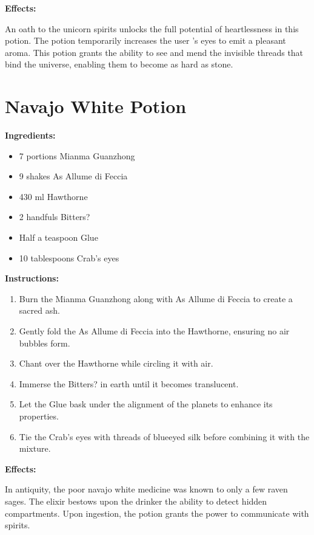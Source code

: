 \documentclass{article}
\begin{document}
\textbf{Effects:}

An oath to the unicorn spirits unlocks the full potential of heartlessness in this potion. The potion temporarily increases the user 's eyes to emit a pleasant aroma. This potion grants the ability to see and mend the invisible threads that bind the universe, enabling them to become as hard as stone.

\newpage
\section*{Navajo White Potion}

\textbf{Ingredients:}

\begin{itemize}
  \item 7 portions Mianma Guanzhong
  \item 9 shakes As Allume di Feccia
  \item 430 ml Hawthorne
  \item 2 handfuls Bitters?
  \item Half a teaspoon Glue
  \item 10 tablespoons Crab's eyes
\end{itemize}

\textbf{Instructions:}

\begin{enumerate}
  \item Burn the Mianma Guanzhong along with As Allume di Feccia to create a sacred ash.
  \item Gently fold the As Allume di Feccia into the Hawthorne, ensuring no air bubbles form.
  \item Chant over the Hawthorne while circling it with air.
  \item Immerse the Bitters? in earth until it becomes translucent.
  \item Let the Glue bask under the alignment of the planets to enhance its properties.
  \item Tie the Crab's eyes with threads of blueeyed silk before combining it with the mixture.
\end{enumerate}

\textbf{Effects:}

In antiquity, the poor navajo white medicine was known to only a few raven sages. The elixir bestows upon the drinker the ability to detect hidden compartments. Upon ingestion, the potion grants the power to communicate with spirits.
\end{document}
